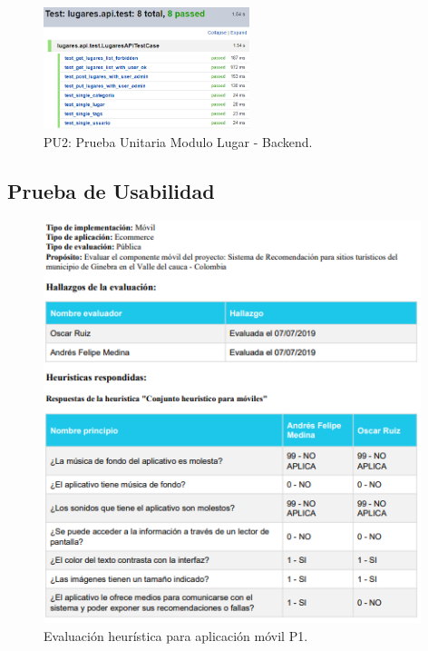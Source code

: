 \documentclass[12pt,letterpaper,openany]{book}
\begin{document}
\begin{figure}[H]
\begin{center}
\includegraphics[width=6cm]{./imagenes/Test/Backend/Test__lugares_api_test}
\caption{PU2: Prueba Unitaria Modulo Lugar - Backend.}
\end{center}
\end{figure}

\subsection{Prueba de Usabilidad}
\begin{figure}[H]
\begin{center}
\includegraphics[width=11cm]{./imagenes/R1}
\caption{Evaluación heurística para aplicación móvil P1.}
\end{center}
\end{figure}
\end{document}
